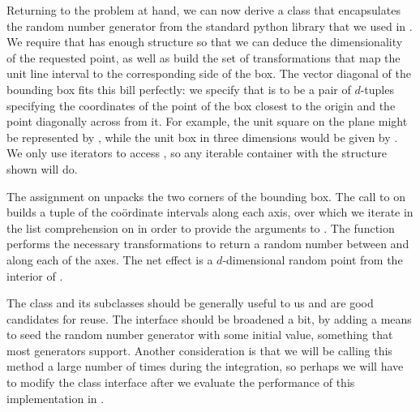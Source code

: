 Returning to the problem at hand, we can now derive a class  that encapsulates
the random number generator from the standard python library that we used in
. We require that  has enough structure so that we can
deduce the dimensionality of the requested point, as well as build the set of transformations
that map the unit line interval to the corresponding side of the box. The vector diagonal of
the bounding box fits this bill perfectly: we specify that  is to be a pair of
$d$-tuples specifying the coordinates of the point of the box closest to the origin and the
point diagonally across from it. For example, the unit square on the plane might be represented
by \literal{[[0,0], [1,1]]}, while the unit box in three dimensions would be given by
\literal{[[0,0,0], [1,1,1]]}.  We only use iterators to access , so any
iterable container with the structure shown will do.
%
%

The assignment on  unpacks the two corners of the bounding box. The call
to  on  builds a tuple of the co\"ordinate intervals along
each axis, over which we iterate in the list comprehension on  in order to
provide the arguments to . The function  performs the
necessary transformations to return a random number between  and
 along each of the axes. The net effect is a $d$-dimensional random point
from the interior of .

The class  and its subclasses should be generally useful to us and are good
candidates for reuse. The interface should be broadened a bit, by adding a means to seed the
random number generator with some initial value, something that most generators support.
Another consideration is that we will be calling this method a large number of times during the
integration, so perhaps we will have to modify the class interface after we evaluate the
performance of this implementation in .


